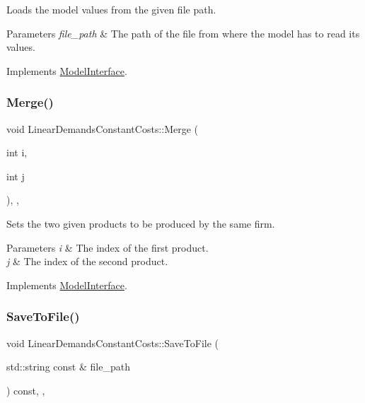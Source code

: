 Loads the model values from the given file path.


\begin{DoxyParams}{Parameters}
{\em file\+\_\+path} & The path of the file from where the model has to read its values. \\
\hline
\end{DoxyParams}


Implements \hyperlink{classModelInterface_a7f408fdb15c10ce8cabf6b942bbc9c38}{Model\+Interface}.

\mbox{\label{classLinearDemandsConstantCosts_a0ee422d927b5a85f9aba8782b02f537b}} 
\subsubsection{\texorpdfstring{Merge()}{Merge()}}
{\footnotesize\ttfamily void Linear\+Demands\+Constant\+Costs\+::\+Merge (\begin{DoxyParamCaption}\item[{int}]{i,  }\item[{int}]{j }\end{DoxyParamCaption})\hspace{0.3cm}{\ttfamily [final]}, {\ttfamily [override]}, {\ttfamily [virtual]}}

Sets the two given products to be produced by the same firm.


\begin{DoxyParams}{Parameters}
{\em i} & The index of the first product. \\
\hline
{\em j} & The index of the second product. \\
\hline
\end{DoxyParams}


Implements \hyperlink{classModelInterface_a9aa52643da1fe9e74750e31a6c6ec469}{Model\+Interface}.

\mbox{\label{classLinearDemandsConstantCosts_aef2823751866a4933a8611dd4622d78b}} 
\subsubsection{\texorpdfstring{Save\+To\+File()}{SaveToFile()}}
{\footnotesize\ttfamily void Linear\+Demands\+Constant\+Costs\+::\+Save\+To\+File (\begin{DoxyParamCaption}\item[{std\+::string const \&}]{file\+\_\+path }\end{DoxyParamCaption}) const\hspace{0.3cm}{\ttfamily [final]}, {\ttfamily [override]}, {\ttfamily [virtual]}}

